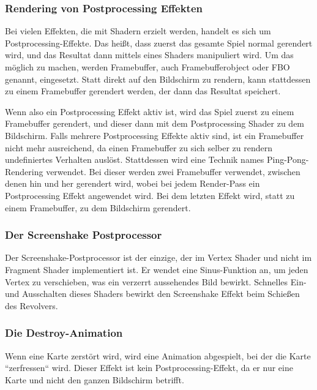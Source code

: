 \subsubsection{Rendering von Postprocessing Effekten}\label{subsubsec:postprocessing-effects}

Bei vielen Effekten, die mit Shadern erzielt werden, handelt es sich um Postprocessing-Effekte.
Das heißt, dass zuerst das gesamte Spiel normal gerendert wird, und das Resultat dann mittels eines Shaders
manipuliert wird.
Um das möglich zu machen, werden Framebuffer, auch Framebufferobject oder FBO genannt, eingesetzt.
Statt direkt auf den Bildschirm zu rendern, kann stattdessen zu einem Framebuffer gerendert werden, der dann das
Resultat speichert.

Wenn also ein Postprocessing Effekt aktiv ist, wird das Spiel zuerst zu einem Framebuffer gerendert, und dieser dann
mit dem Postprocessing Shader zu dem Bildschirm.
Falls mehrere Postprocessing Effekte aktiv sind, ist ein Framebuffer nicht mehr ausreichend, da einen Framebuffer
zu sich selber zu rendern undefiniertes Verhalten auslöst.
Stattdessen wird eine Technik names Ping-Pong-Rendering verwendet.
Bei dieser werden zwei Framebuffer verwendet, zwischen denen hin und her gerendert wird, wobei bei jedem Render-Pass ein
Postprocessing Effekt angewendet wird.
Bei dem letzten Effekt wird, statt zu einem Framebuffer, zu dem Bildschirm gerendert.

\subsubsection{Der Screenshake Postprocessor}

Der Screenshake-Postprocessor ist der einzige, der im Vertex Shader und nicht im Fragment Shader implementiert ist.
Er wendet eine Sinus-Funktion an, um jeden Vertex zu verschieben, was ein verzerrt aussehendes Bild bewirkt.
Schnelles Ein- und Ausschalten dieses Shaders bewirkt den Screenshake Effekt beim Schießen des Revolvers.

\subsubsection{Die Destroy-Animation}

Wenn eine Karte zerstört wird, wird eine Animation abgespielt, bei der die Karte ``zerfressen`` wird.
Dieser Effekt ist kein Postprocessing-Effekt, da er nur eine Karte und nicht den ganzen Bildschirm betrifft.

